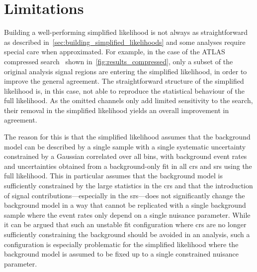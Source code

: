 \section{Limitations}

Building a well-performing simplified likelihood is not always as straightforward as described in~\cref{sec:building_simplified_likelihoods} and some analyses require special care when approximated. For example, in the case of the ATLAS compressed search~\cite{SUSY-2018-16} shown in~\cref{fig:results_compressed}, only a subset of the original analysis signal regions are entering the simplified likelihood, in order to improve the general agreement. The straightforward structure of the simplified likelihood is, in this case, not able to reproduce the statistical behaviour of the full likelihood. As the omitted channels only add limited sensitivity to the search, their removal in the simplified likelihood yields an overall improvement in agreement. 

The reason for this is that the simplified likelihood assumes that the background model can be described by a single sample with a single systematic uncertainty constrained by a Gaussian correlated over all bins, with background event rates and uncertainties obtained from a background-only fit in all \glspl{cr} and \glspl{sr} using the full likelihood. This in particular assumes that the background model is sufficiently constrained by the large statistics in the \glspl{cr} and that the introduction of signal contributions---especially in the \glspl{sr}---does not significantly change the background model in a way that cannot be replicated with a single background sample where the event rates only depend on a single nuisance parameter. While it can be argued that such an unstable fit configuration where \glspl{cr} are no longer sufficiently constraining the background should be avoided in an analysis, such a configuration is especially problematic for the simplified likelihood where the background model is assumed to be fixed up to a single constrained nuisance parameter.


